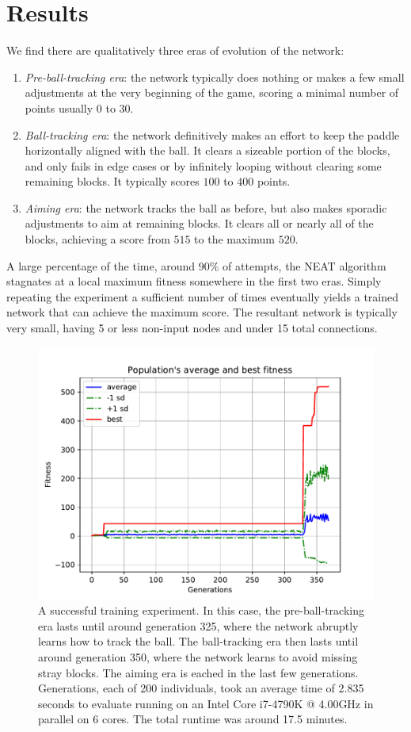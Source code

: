 \documentclass[letterpaper, twocolumn, conference]{article}
\begin{document}
\section{Results}
We find there are qualitatively three eras of evolution of the network:
\begin{enumerate}
    \item{}\emph{Pre-ball-tracking era}: the network typically does nothing or makes a few small adjustments at the very beginning of the game, scoring a minimal number of points usually $0$ to $30$.
    \item{}\emph{Ball-tracking era}: the network definitively makes an effort to keep the paddle horizontally aligned with the ball. It clears a sizeable portion of the blocks, and only fails in edge cases or by infinitely looping without clearing some remaining blocks. It typically scores $100$ to $400$ points.
    \item{}\emph{Aiming era}: the network tracks the ball as before, but also makes sporadic adjustments to aim at remaining blocks. It clears all or nearly all of the blocks, achieving a score from $515$ to the maximum $520$.
\end{enumerate}
A large percentage of the time, around $90\%$ of attempts, the NEAT algorithm stagnates at a local maximum
fitness somewhere in the first two eras.
Simply repeating the experiment a sufficient number of times eventually yields a trained network that
can achieve the maximum score.
The resultant network is typically very small, having 5 or less non-input nodes and under 15 total connections.
\begin{figure}[h!]
    \centering
    \includegraphics[width=.54 \textwidth]{avg_fitness.pdf}
    \caption{A successful training experiment. In this case, the pre-ball-tracking era lasts
        until around generation 325, where the network abruptly learns how to track the ball.
        The ball-tracking era then lasts until around generation 350, where the network learns to avoid missing stray blocks. The aiming era is eached in the last few generations.
        Generations, each of 200 individuals, took an average time of 2.835 seconds to evaluate running on an
        Intel Core i7-4790K @ 4.00GHz in parallel on 6 cores. The total runtime was around 17.5 minutes.}
\end{figure}
\end{document}
